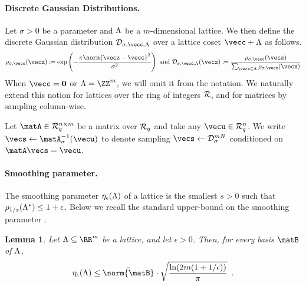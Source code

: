 \documentclass[11pt,letterpaper]{article}
\newcounter{theo}[section]
\newtheorem{lemma}[theorem]{Lemma}
\theoremstyle{definition} %
\newcommand{\from}{\gets}
\begin{document}
\paragraph{Discrete Gaussian Distributions.} Let $\sigma > 0$ be a parameter and $\Lambda$ be a $m$-dimensional lattice. We then define the discrete Gaussian distribution $\discGauss_{\sigma, \vecc, \Lattice}$ over a lattice coset $\vecc + \Lattice$ as follows.
\begin{equation*}
  \rho_{\sigma, \vecc}(\vecz) \coloneqq \exp\left( - \frac{\pi \norm{\vecz - \vecc}^2}{\sigma^2} \right) \text{ and } \discGauss_{\sigma, \vecc, \Lattice}(\vecz) \coloneqq \frac{\rho_{\sigma, \vecc}(\vecz)}{\sum_{\vecx \in \Lattice} \rho_{\sigma, \vecc}(\vecx)}
\end{equation*}
When $\vecc = \veczero$ or $\Lattice = \ZZ^m$, we will omit it from the notation. We naturally extend this notion for lattices over the ring of integers $\mathcal{R}$, and for matrices by sampling column-wise.

Let $\matA \in \Rq^{n \times m}$ be a matrix over $\mathcal{R}_q$ and take any $\vecu \in \Rq^n$. We write $\vecs \from \matA^{-1}_\sigma (\vecu)$ to denote sampling $\vecs \from \discGauss^{mN}_{\sigma}$ conditioned on $\matA\vecs = \vecu$. 

\paragraph{Smoothing parameter.}
The smoothing parameter $\eta_\epsilon(\Lambda)$ of a lattice is the smallest $s > 0$ such that $\rho_{1/s}(\Lambda^*) \leq 1 + \epsilon$. Below we recall the standard upper-bound on the smoothing parameter \cite{MicciancioR07,DBLP:conf/stoc/GentryPV08}.

\begin{lemma}
  \label{lemma:smoothing}
  Let $\Lattice \subseteq \RR^m$ be a lattice, and let $\epsilon > 0$.
  Then, for every basis $\matB$ of $\Lambda$,
  \begin{equation*}
    \smoothing_{\epsilon}(\Lattice) \leq \tilde{\norm{\matB}} \cdot \sqrt{\frac{\ln(2m(1 + 1/\epsilon))}{\pi}} \enspace.
  \end{equation*}
\end{lemma}
\end{document}
